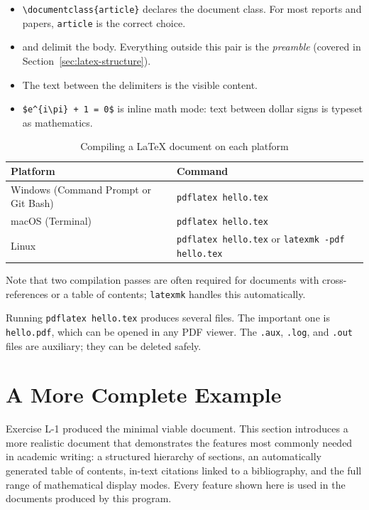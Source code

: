 \begin{itemize}
    \item \verb|\documentclass{article}| declares the document class.
          For most reports and papers, \texttt{article} is the correct
          choice.
    \item \verb|| and \verb|| delimit
          the body. Everything outside this pair is the
          \emph{preamble} (covered in
          Section~\ref{sec:latex-structure}).
    \item The text between the delimiters is the visible content.
    \item \verb|$e^{i\pi} + 1 = 0$| is inline math mode: text
          between dollar signs is typeset as mathematics.
\end{itemize}

\begin{table}[htbp]
\centering
\caption{Compiling a \LaTeX{} document on each platform}
\label{tab:latex-compile}
\footnotesize
\begin{tabular}{ll}
\toprule
\textbf{Platform} & \textbf{Command} \\
\midrule
Windows (Command Prompt or Git Bash) & \texttt{pdflatex hello.tex} \\
macOS (Terminal) & \texttt{pdflatex hello.tex} \\
Linux & \texttt{pdflatex hello.tex} or \texttt{latexmk -pdf hello.tex} \\
\bottomrule
\end{tabular}
\end{table}

Note that two compilation passes are often required for documents with
cross-references or a table of contents; \texttt{latexmk} handles
this automatically.

\vs
\noindent
Running \texttt{pdflatex hello.tex} produces several files. The
important one is \texttt{hello.pdf}, which can be opened in any PDF
viewer. The \texttt{.aux}, \texttt{.log}, and \texttt{.out} files are
auxiliary; they can be deleted safely.

\section{A More Complete Example}
\label{sec:latex-example2}

Exercise L-1 produced the minimal viable document. This section
introduces a more realistic document that demonstrates the features
most commonly needed in academic writing: a structured hierarchy of
sections, an automatically generated table of contents, in-text
citations linked to a bibliography, and the full range of mathematical
display modes. Every feature shown here is used in the documents
produced by this program.

